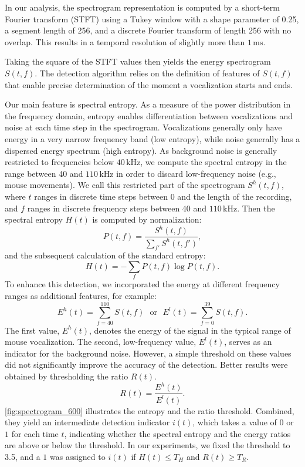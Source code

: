 \documentclass[preprint,NumberedRefs]{JASA}
\begin{document}
In our analysis, the spectrogram representation is computed by a short-term Fourier transform (STFT) using a Tukey window with a shape parameter of 0.25, a segment length of 256, and a discrete Fourier transform of length 256 with no overlap. This results in a temporal resolution of slightly more than \(1\,\mathrm{ms} \).

Taking the square of the STFT values then yields the energy spectrogram \(S(t,f)\). The detection algorithm relies on the definition of features of \(S(t,f)\) that enable precise determination of the moment a vocalization starts and ends.

Our main feature is spectral entropy. As a measure of the power distribution in the frequency domain, entropy enables differentiation between vocalizations and noise at each time step in the spectrogram. Vocalizations generally only have energy in a very narrow frequency band (low entropy), while noise generally has a dispersed energy spectrum (high entropy).
As background noise is generally restricted to frequencies below \(40\,\mathrm{kHz} \), we compute the spectral entropy in the range between 40 and \(110\,\mathrm{kHz} \) in order to discard low-frequency noise (e.g., mouse movements). We call this restricted part of the spectrogram \(S^h(t,f)\), where \(t\) ranges in discrete time steps between 0 and the length of the recording, and \(f\) ranges in discrete frequency steps between 40 and \(110\,\mathrm{kHz} \). Then the spectral entropy \(H(t)\) is computed by normalization:
    \begin{equation}
    P(t,f) = \frac{S^h(t,f)}{\sum_{f'} S^h(t,f')},
    \end{equation}
    and the subsequent calculation of the standard entropy:
    \begin{equation}
    H(t) = - \sum_f P(t,f) \log P(t,f).
    \end{equation}
To enhance this detection, we incorporated the energy at different frequency ranges as additional features, for example:
$$E^h(t)=\sum_{f=40}^{110}  S(t,f) \ \ \ \mbox{or} \ \ \  E^l(t)=\sum_{f=0}^{39} S(t,f).$$
The first value, $E^h(t)$, denotes the energy of the signal in the typical range of mouse vocalization. The second, low-frequency value, $E^l(t)$, serves as an indicator for the background noise.
However, a simple threshold on these values did not significantly improve the accuracy of the detection. Better results were obtained by thresholding the ratio $R(t)$.
     \begin{equation}
    R(t) = \frac{E^h(t)}{E^l(t)}.
    \end{equation}
\autoref{fig:spectrogram_600} illustrates the entropy and the ratio threshold. Combined, they yield an intermediate detection indicator $i(t)$, which takes a value of $0$ or $1$ for each time $t$, indicating whether the spectral entropy and the energy ratios are above or below the threshold. In our experiments, we fixed the threshold to 3.5, and a $1$ was assigned to $i(t)$ if $H(t) \leq T_H$ and $R(t) \geq T_R$.
\end{document}
